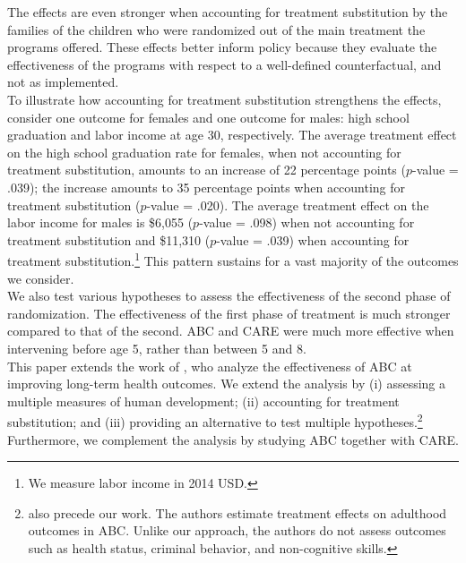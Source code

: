 \noindent The effects are even stronger when accounting for treatment substitution by the families of the children who were randomized out of the main treatment  the programs offered. These effects better inform policy because they evaluate the effectiveness of the programs with respect to a well-defined counterfactual, and not as implemented.\\ 

\noindent To illustrate how accounting for treatment substitution strengthens the effects, consider one outcome for females and one outcome for males: high school graduation and labor income at age 30, respectively. The average treatment effect on the high school graduation rate for females, when not accounting for treatment substitution, amounts to an increase of 22 percentage points ($p$-value = .039); the increase amounts to 35 percentage points when accounting for treatment substitution ($p$-value = .020). The average treatment effect on the labor income for males is \$6,055 ($p$-value = .098) when not accounting for treatment substitution and \$11,310 ($p$-value = .039) when accounting for treatment substitution.\footnote{We measure labor income in 2014 USD.} This pattern sustains for a vast majority of the outcomes we consider.\\

\noindent We also test various hypotheses to assess the effectiveness of the second phase of randomization. The effectiveness of the first phase of treatment is much stronger compared to that of the second. ABC and CARE were much more effective when intervening before age 5, rather than between 5 and 8.\\

\noindent This paper extends the work of \citet{Campbell_Conti_etal_2014_EarlyChildhoodInvestments}, who analyze the effectiveness of ABC at improving long-term health outcomes. We extend the analysis by (i) assessing a multiple measures of human development; (ii) accounting for treatment substitution; and (iii) providing an alternative to test multiple hypotheses.\footnote{\cite{Campbell_Pungello_etal_2012_DP} also precede our work. The authors estimate treatment effects on adulthood outcomes in ABC. Unlike our approach, the authors do not assess outcomes such as health status, criminal behavior, and non-cognitive skills.} Furthermore, we complement the analysis by studying ABC together with CARE.\\

